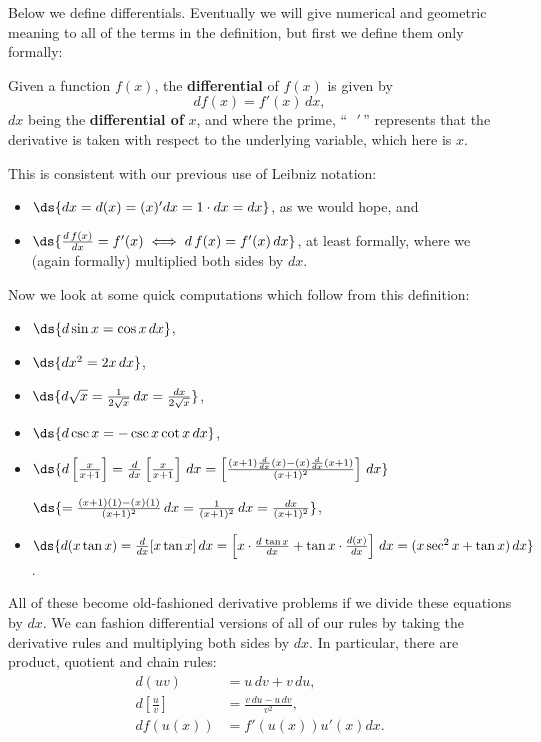 Below we define differentials.  Eventually we will give 
numerical and geometric meaning to all of the terms in
the definition, but first we define them only formally:
\begin{definition} Given a function $f(x)$, the
{\bf differential} of $f(x)$ is given by
\begin{equation}df(x)=f'(x)\,dx,\label{EquationDefiningDifferentials}
\end{equation}
$dx$ being the {\bf differential of} $x$, and 
where the prime, ``\ \,$'\,$'' represents that the derivative is taken with
respect to the underlying variable, which here is $x$.
\label{DefinitionOfDifferential}
\end{definition}
This is consistent with our previous use of Leibniz notation:
\begin{itemize}
\item $\ds{dx=d(x)=(x)'dx=1\cdot dx=dx}$, as we would hope, and
\item $\ds{\frac{d\,f(x)}{dx}=f'(x)\iff d\,f(x)=f'(x)\,dx}$,
      at least formally, where we (again formally)
       multiplied both sides by $dx$.
\end{itemize}
Now we look at some quick computations which follow from this
definition:
\begin{itemize}
\item $\ds{d\sin x=\cos x\,dx}$,
\item $\ds{dx^2=2x\,dx}$,
\item $\ds{d\sqrt{x}=\frac{1}{2\sqrt x}\,dx=\frac{dx}{2\sqrt{x}}}$,
\item $\ds{d\csc x=-\csc x\cot x\,dx}$,
\item $\ds{d\left[\frac{x}{x+1}\right]
           =\frac{d}{dx}\left[\frac{x}{x+1}\right]\,dx
             =\left[\frac{(x+1)\frac{d}{dx}(x)-(x)\frac{d}{dx}(x+1)}
                         {(x+1)^2}\right]\,dx}$

     \qquad$\ds{       =\frac{(x+1)(1)-(x)(1)}{(x+1)^2}\,dx
       =\frac1{(x+1)^2}\,dx=\frac{dx}{(x+1)^2}}$,
\item $\ds{d(x\tan x)=\frac{d}{dx}[x\tan x]\,dx
         =\left[x\cdot\frac{d\,\tan x}{dx}+\tan x\cdot\frac{d(x)}{dx}
         \right]\,dx=(x\sec^2x+\tan x)\,dx}$.
\end{itemize}
All of these become old-fashioned derivative problems if we divide
these equations by $dx$.  We can fashion differential versions of all
of our rules by taking the derivative rules and multiplying both
sides by $dx$.  In particular, there are product, quotient and
chain rules:
\begin{align}
d(uv)&=u\,dv+v\,du, \label{ProductRuleForDifferentials}\\
d\left[\frac{u}{v}\right]
          &=\frac{v\,du-u\,dv}{v^2},\label{QuotientRuleForDifferentials}\\
d f(u(x))&=f'(u(x))u'(x)dx.\label{ChainRuleForF(U(X))ForDifferentials}
\end{align}
